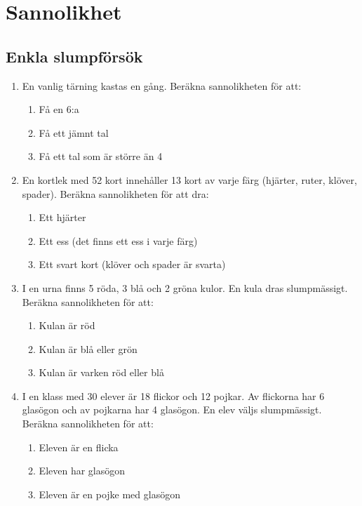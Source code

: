 
\newpage
\section*{Sannolikhet}

\subsection*{Enkla slumpförsök}

\begin{enumerate}[label=\textbf{\arabic*.}]
    \item En vanlig tärning kastas en gång. Beräkna sannolikheten för att:
    \begin{enumerate}[label=\alph*)]
        \item Få en 6:a
        \item Få ett jämnt tal
        \item Få ett tal som är större än 4
    \end{enumerate}
    
    \item En kortlek med 52 kort innehåller 13 kort av varje färg (hjärter, ruter, klöver, spader). Beräkna sannolikheten för att dra:
    \begin{enumerate}[label=\alph*)]
        \item Ett hjärter
        \item Ett ess (det finns ett ess i varje färg)
        \item Ett svart kort (klöver och spader är svarta)
    \end{enumerate}
    
    \item I en urna finns 5 röda, 3 blå och 2 gröna kulor. En kula dras slumpmässigt. Beräkna sannolikheten för att:
    \begin{enumerate}[label=\alph*)]
        \item Kulan är röd
        \item Kulan är blå eller grön
        \item Kulan är varken röd eller blå
    \end{enumerate}
    
    \item I en klass med 30 elever är 18 flickor och 12 pojkar. Av flickorna har 6 glasögon och av pojkarna har 4 glasögon. En elev väljs slumpmässigt. Beräkna sannolikheten för att:
    \begin{enumerate}[label=\alph*)]
        \item Eleven är en flicka
        \item Eleven har glasögon
        \item Eleven är en pojke med glasögon
    \end{enumerate}
\end{enumerate}

